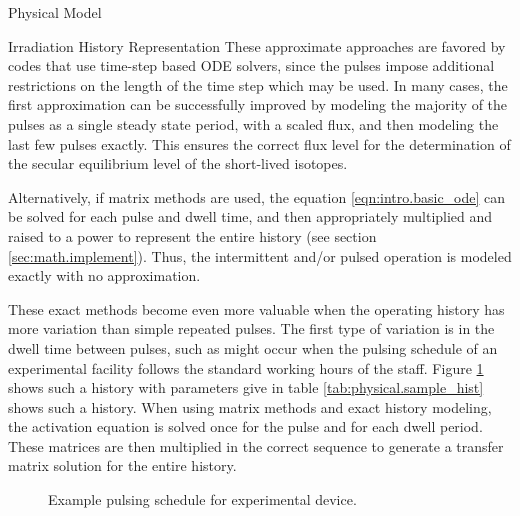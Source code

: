 \begin{chapter}{Physical Model\label{chap:physical}}
\begin{section}{Irradiation History Representation\label{sec:physical.pulsing}}
  These approximate approaches are favored by codes that use time-step
  based ODE solvers, since the pulses impose additional restrictions
  on the length of the time step which may be used.  In many cases,
  the first approximation can be successfully improved by modeling
  the majority of the pulses as a single steady state period, with a
  scaled flux, and then modeling the last few pulses
  exactly\cite{FISPACT-pulse}.  This ensures the correct flux level for
  the determination of the secular equilibrium level of the
  short-lived isotopes.
  
  Alternatively, if matrix methods are used, the equation
  \ref{eqn:intro.basic_ode} can be solved for each pulse and dwell
  time, and then appropriately multiplied and raised to a power to
  represent the entire history (see section \ref{sec:math.implement}).
  Thus, the intermittent and/or pulsed operation is modeled exactly
  with no approximation\cite{spanglerMS,spangler}.
  
  These exact methods become even more valuable when the operating
  history has more variation than simple repeated pulses.  The first
  type of variation is in the dwell time between pulses, such as might
  occur when the pulsing schedule of an experimental facility follows
  the standard working hours of the staff.  Figure
  \ref{fig:physical.sample_hist} shows such a history with parameters
  give in table \ref{tab:physical.sample_hist} shows such a history.
  When using matrix methods and exact history modeling, the activation
  equation is solved once for the pulse and for each dwell period.
  These matrices are then multiplied in the correct sequence to
  generate a transfer matrix solution for the entire history.

  \begin{figure}[htbp]
    \begin{center}
      \leavevmode
      \caption{Example pulsing schedule for experimental device.}
      \label{fig:physical.sample_hist}
    \end{center}
  \end{figure}


\end{section}
\end{chapter}
